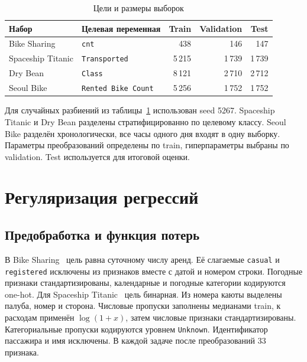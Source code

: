 \documentclass[a4paper,12pt]{article}
\begin{document}
\begin{table}[H]
\centering
\caption{Цели и размеры выборок}
\label{tab:data}
\small
\begin{tabular}{llrrr}
\toprule
Набор & Целевая переменная & Train & Validation & Test \\
\midrule
Bike Sharing & \texttt{cnt} & 438 & 146 & 147 \\
Spaceship Titanic & \texttt{Transported} & 5\,215 & 1\,739 & 1\,739 \\
Dry Bean & \texttt{Class} & 8\,121 & 2\,710 & 2\,712 \\
Seoul Bike & \texttt{Rented Bike Count} & 5\,256 & 1\,752 & 1\,752 \\
\bottomrule
\end{tabular}
\end{table}

Для случайных разбиений из таблицы~\ref{tab:data} использован seed 5267. Spaceship Titanic и Dry Bean разделены стратифицированно по целевому классу. Seoul Bike разделён хронологически, все часы одного дня входят в одну выборку. Параметры преобразований определены по train, гиперпараметры выбраны по validation. Test используется для итоговой оценки.

\section{Регуляризация регрессий}

\subsection{Предобработка и функция потерь}

В Bike Sharing~\cite{bike} цель равна суточному числу аренд. Её слагаемые \texttt{casual} и \texttt{registered} исключены из признаков вместе с датой и номером строки. Погодные признаки стандартизированы, календарные и погодные категории кодируются one-hot. Для Spaceship Titanic~\cite{ship} цель бинарная. Из номера каюты выделены палуба, номер и сторона. Числовые пропуски заполнены медианами train, к расходам применён $\log(1+x)$, затем числовые признаки стандартизированы. Категориальные пропуски кодируются уровнем \texttt{Unknown}. Идентификатор пассажира и имя исключены. В каждой задаче после преобразований 33 признака.
\end{document}

